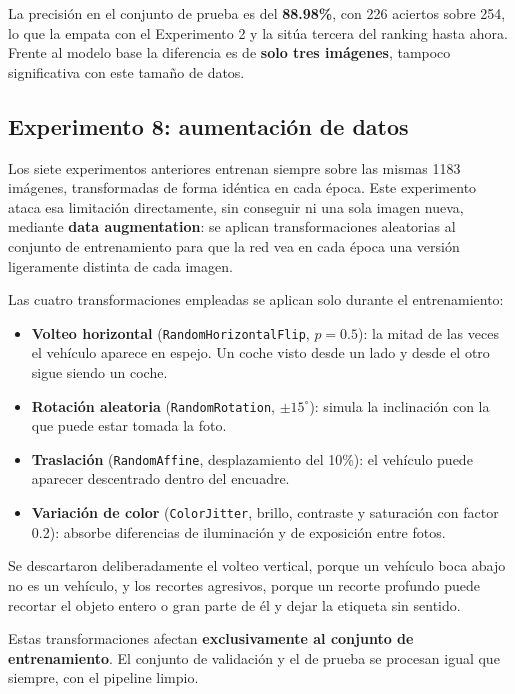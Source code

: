 \documentclass[11pt, a4paper]{article}
\begin{document}
La precisión en el conjunto de prueba es del \textbf{88.98\%}, con 226 aciertos sobre 254, lo que la empata con el Experimento 2 y la sitúa tercera del ranking hasta ahora. Frente al modelo base la diferencia es de \textbf{solo tres imágenes}, tampoco significativa con este tamaño de datos.

\subsection{Experimento 8: aumentación de datos}

Los siete experimentos anteriores entrenan siempre sobre las mismas 1183 imágenes, transformadas de forma idéntica en cada época. Este experimento ataca esa limitación directamente, sin conseguir ni una sola imagen nueva, mediante \textbf{data augmentation}: se aplican transformaciones aleatorias al conjunto de entrenamiento para que la red vea en cada época una versión ligeramente distinta de cada imagen.

Las cuatro transformaciones empleadas se aplican solo durante el entrenamiento:

\begin{itemize}
    \item \textbf{Volteo horizontal} (\texttt{RandomHorizontalFlip}, $p = 0.5$): la mitad de las veces el vehículo aparece en espejo. Un coche visto desde un lado y desde el otro sigue siendo un coche.
    \item \textbf{Rotación aleatoria} (\texttt{RandomRotation}, $\pm 15^{\circ}$): simula la inclinación con la que puede estar tomada la foto.
    \item \textbf{Traslación} (\texttt{RandomAffine}, desplazamiento del 10\%): el vehículo puede aparecer descentrado dentro del encuadre.
    \item \textbf{Variación de color} (\texttt{ColorJitter}, brillo, contraste y saturación con factor 0.2): absorbe diferencias de iluminación y de exposición entre fotos.
\end{itemize}

Se descartaron deliberadamente el volteo vertical, porque un vehículo boca abajo no es un vehículo, y los recortes agresivos, porque un recorte profundo puede recortar el objeto entero o gran parte de él y dejar la etiqueta sin sentido.

Estas transformaciones afectan \textbf{exclusivamente al conjunto de entrenamiento}. El conjunto de validación y el de prueba se procesan igual que siempre, con el pipeline limpio. 
\end{document}
